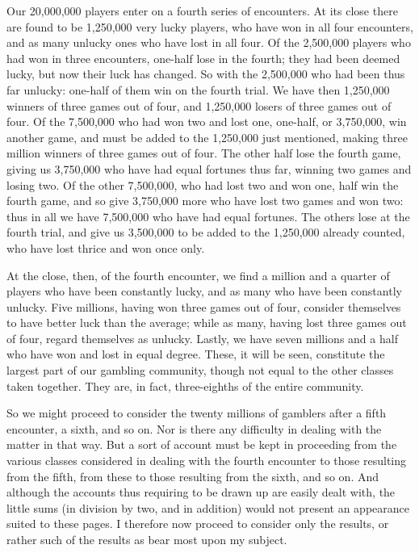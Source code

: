 \documentclass[letterpaper,12pt,oneside,openany]{memoir}
\begin{document}
Our 20,000,000 players enter on a fourth series of
encounters. At its close there are found to be 1,250,000
very lucky players, who have won in all four encounters,
and as many unlucky ones who have lost in all four.
Of the 2,500,000 players who had won in three encounters,
one-half lose in the fourth; they had been
deemed lucky, but now their luck has changed. So
with the 2,500,000 who had been thus far unlucky:
one-half of them win on the fourth trial. We have
then 1,250,000 winners of three games out of four, and
1,250,000 losers of three games out of four. Of the
7,500,000 who had won two and lost one, one-half, or
3,750,000, win another game, and must be added to the
1,250,000 just mentioned, making three million winners
of three games out of four. The other half lose the
fourth game, giving us 3,750,000 who have had equal
fortunes thus far, winning two games and losing two.
Of the other 7,500,000, who had lost two and won one,
half win the fourth game, and so give 3,750,000 more
who have lost two games and won two: thus in all we
have 7,500,000 who have had equal fortunes. The
others lose at the fourth trial, and give us 3,500,000 to
be added to the 1,250,000 already counted, who have
lost thrice and won once only.

At the close, then, of the fourth encounter, we find
a million and a quarter of players who have been constantly
lucky, and as many who have been constantly
unlucky. Five millions, having won three games out
of four, consider themselves to have better luck than
the average; while as many, having lost three games
out of four, regard themselves as unlucky. Lastly, we
have seven millions and a half who have won and lost
in equal degree. These, it will be seen, constitute the
largest part of our gambling community, though not
equal to the other classes taken together. They are, in
fact, three-eighths of the entire community.

So we might proceed to consider the twenty millions
of gamblers after a fifth encounter, a sixth, and so
on. Nor is there any difficulty in dealing with the
matter in that way. But a sort of account must be
kept in proceeding from the various classes considered
in dealing with the fourth encounter to those resulting
from the fifth, from these to those resulting from the
sixth, and so on. And although the accounts thus
requiring to be drawn up are easily dealt with, the
little sums (in division by two, and in addition) would
not present an appearance suited to these pages. I
therefore now proceed to consider only the results,
or rather such of the results as bear most upon my
subject.
\end{document}
